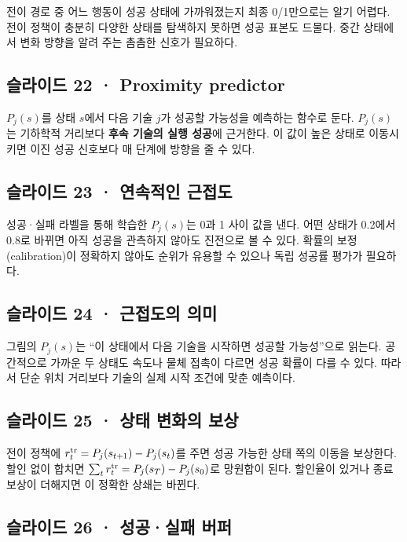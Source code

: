 \documentclass[11pt,a4paper]{article}
\begin{document}
전이 경로 중 어느 행동이 성공 상태에 가까워졌는지 최종 0/1만으로는 알기 어렵다. 전이 정책이 충분히 다양한 상태를 탐색하지 못하면 성공 표본도 드물다. 중간 상태에서 변화 방향을 알려 주는 촘촘한 신호가 필요하다.\par

\subsection{슬라이드 22 · Proximity predictor}

$P_j(s)$를 상태 $s$에서 다음 기술 $j$가 성공할 가능성을 예측하는 함수로 둔다. $P_j(s)$는 기하학적 거리보다 \textbf{후속 기술의 실행 성공}에 근거한다. 이 값이 높은 상태로 이동시키면 이진 성공 신호보다 매 단계에 방향을 줄 수 있다.\par

\subsection{슬라이드 23 · 연속적인 근접도}

성공·실패 라벨을 통해 학습한 $P_j(s)$는 0과 1 사이 값을 낸다. 어떤 상태가 0.2에서 0.8로 바뀌면 아직 성공을 관측하지 않아도 진전으로 볼 수 있다. 확률의 보정(calibration)이 정확하지 않아도 순위가 유용할 수 있으나 독립 성공률 평가가 필요하다.\par

\subsection{슬라이드 24 · 근접도의 의미}

그림의 $P_j(s)$는 “이 상태에서 다음 기술을 시작하면 성공할 가능성”으로 읽는다. 공간적으로 가까운 두 상태도 속도나 물체 접촉이 다르면 성공 확률이 다를 수 있다. 따라서 단순 위치 거리보다 기술의 실제 시작 조건에 맞춘 예측이다.\par

\subsection{슬라이드 25 · 상태 변화의 보상}

전이 정책에 $r_t^{\rm tr}=P_j(s_{t+1})-P_j(s_t)$를 주면 성공 가능한 상태 쪽의 이동을 보상한다. 할인 없이 합치면 $\sum_t r_t^{\rm tr}=P_j(s_T)-P_j(s_0)$로 망원합이 된다. 할인율이 있거나 종료 보상이 더해지면 이 정확한 상쇄는 바뀐다.\par

\subsection{슬라이드 26 · 성공·실패 버퍼}
\end{document}
